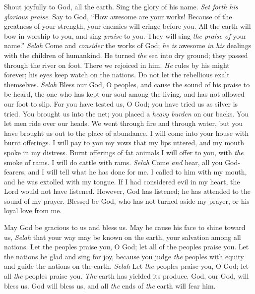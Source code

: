 \begin{biblechapter} %
 Shout joyfully to God, all the earth.
\verse Sing the glory of his name. 
\textit{Set forth his glorious praise}.
\verse Say to God, “How awesome are your works! 
Because of the greatness of your strength, 
your enemies will cringe before you.
\verse All the earth will bow in worship to you, 
and sing \textit{praise} to you. 
They will sing \textit{the praise of} your name.” \textit{Selah}
\verse Come and \textit{consider} the works of God; 
\textit{he is} awesome \textit{in his} dealings with the children of humankind.
\verse He turned \textit{the} sea into dry ground; 
they passed through the river on foot. 
There we rejoiced in him.
\verse \textit{He} rules by his might forever; 
his eyes keep watch on the nations. 
Do not let the rebellious exalt themselves. \textit{Selah}
\verse Bless our God, O peoples, 
and cause the sound of his praise to be heard,
\verse the one who has kept our soul among the living, 
and has not allowed our foot to slip.
\verse For you have tested us, O God; 
you have tried us as silver is tried.
\verse You brought us into the net; 
you placed a \textit{heavy burden} on our backs.
\verse You let men ride over our heads. 
We went through fire and through water, 
but you have brought us out to the place of abundance.
\verse I will come into your house with burnt offerings. 
I will pay to you my vows
\verse that my lips uttered, 
and my mouth spoke in my distress.
\verse Burnt offerings of fat animals I will offer to you, 
with \textit{the} smoke of rams. 
I will do cattle with rams. \textit{Selah}
\verse Come \textit{and} hear, all you God-fearers, and I will tell 
what he has done for me.
\verse I called to him with my mouth, 
and he was extolled with my tongue.
\verse If I had considered evil in my heart, 
the Lord would not have listened.
\verse However, God has listened; 
he has attended to the sound of my prayer.
\verse Blessed be God, 
who has not turned aside my prayer, 
or his loyal love from me.
\end{biblechapter}

\begin{biblechapter} %
 May God be gracious to us and bless us. 
May he cause his face to shine toward us, \textit{Selah}
\verse that your way may be known on the earth, 
your salvation among all nations.
\verse Let the peoples praise you, O God; 
let all of the peoples praise you.
\verse Let the nations be glad and sing for joy, 
because you judge \textit{the} peoples with equity 
and guide the nations on the earth. \textit{Selah}
\verse Let \textit{the} peoples praise you, O God; 
let all \textit{the} peoples praise you.
\verse \textit{The} earth has yielded its produce. 
God, our God, will bless us.
\verse God will bless us, 
and all \textit{the} ends of \textit{the} earth will fear him.
\end{biblechapter}

